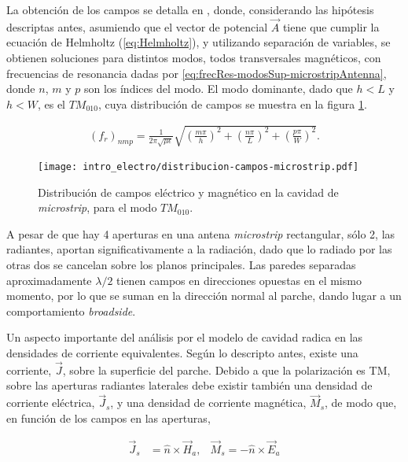 La obtención de los campos se detalla en \cite{Balanis:Advanced}, donde, considerando las hipótesis descriptas antes, asumiendo que el vector de potencial $\vec{A}$ tiene que cumplir la ecuación de Helmholtz (\ref{eq:Helmholtz}), y utilizando separación de variables, se obtienen soluciones para distintos modos, todos transversales magnéticos, con frecuencias de resonancia dadas por \ref{eq:frecRes-modosSup-microstripAntenna}, donde $n$, $m$ y $p$ son los índices del modo. El modo dominante, dado que $h < L$ y $h < W$, es el $TM_{010}$, cuya distribución de campos se muestra en la figura \ref{fig:distribucion-campos-microstrip}.
 
\begin{align}
	(f_r)_{nmp} = \frac{1}{2 \pi \sqrt{\mu \epsilon}} \sqrt{\left(\frac{m\pi}{h}\right)^2 + \left(\frac{n\pi}{L}\right)^2 + \left(\frac{p\pi}{W}\right)^2}.
	\label{eq:frecRes-modosSup-microstripAntenna}
\end{align}

\begin{figure}[htp]
	\centering
	\texttt{[image: intro\_electro/distribucion-campos-microstrip.pdf]}
	\caption{Distribución de campos eléctrico y magnético en la cavidad de \textit{microstrip}, para el modo $TM_{010}$.}
	\label{fig:distribucion-campos-microstrip}
\end{figure}

A pesar de que hay 4 aperturas en una antena \textit{microstrip} rectangular, sólo 2, las radiantes, aportan significativamente a la radiación, dado que lo radiado por las otras dos se cancelan sobre los planos principales. Las paredes separadas aproximadamente $\lambda/2$ tienen campos en direcciones opuestas en el mismo momento, por lo que se suman en la dirección normal al parche, dando lugar a un comportamiento \textit{broadside}.

Un aspecto importante del análisis por el modelo de cavidad radica en las densidades de corriente equivalentes. Según lo descripto antes, existe una corriente, $\vec{J}$, sobre la superficie del parche. Debido a que la polarización es TM, sobre las aperturas radiantes laterales debe existir también una densidad de corriente eléctrica, $\vec{J}_s$, y una densidad de corriente magnética, $\vec{M}_s$, de modo que, en función de los campos en las aperturas,

\begin{align}
	\vec{J}_s &= \hat{n} \times \vec{H}_a, & \vec{M}_s = - \hat{n} \times \vec{E}_a
\end{align}

